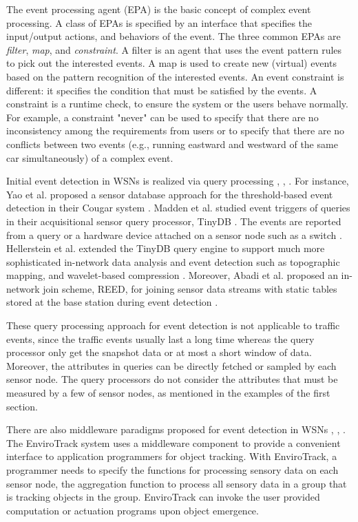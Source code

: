 \documentclass[12pt,journal,draftcls,letterpaper,onecolumn]{elsarticle}
\begin{document}
The event processing agent (EPA) is the basic concept of complex
event processing. A class of EPAs is specified by an interface that
specifies the input/output actions, and behaviors of the event. The
three common EPAs are \emph{filter}, \emph{map}, and
\emph{constraint}. A filter is an agent that uses the event pattern
rules to pick out the interested events. A map is used to create new
(virtual) events based on the pattern recognition of the interested
events. An event constraint is different: it specifies the condition
that must be satisfied by the events. A constraint is a runtime
check, to ensure the system or the users behave normally. For
example, a constraint "never" can be used to specify that there are
no inconsistency among the requirements from users or to specify
that there are no conflicts between two events (e.g., running
eastward and westward of the same car simultaneously) of a complex
event.

Initial event detection in WSNs is realized via query processing
\cite{345920}, \cite{cougar}, \cite{tinydb}. For instance, Yao et
al. proposed a sensor database approach for the threshold-based
event detection in their Cougar system \cite{cougar}. Madden et al.
studied event triggers of queries in their acquisitional sensor
query processor, TinyDB \cite{tinydb}. The events are reported from
a query or a hardware device attached on a sensor node such as a
switch \cite{tinydb}. Hellerstein et al. extended the TinyDB query
engine to support much more sophisticated in-network data analysis
and event detection such as topographic mapping, and wavelet-based
compression \cite{Hellerstein03beyondaverage}. Moreover, Abadi et
al. proposed an in-network join scheme, REED, for joining sensor
data streams with static tables stored at the base station during
event detection \cite{DBLP:conf/vldb/AbadiML05}.

These query processing approach for event detection is not
applicable to traffic events, since the traffic events usually last
a long time whereas the query processor only get the snapshot data
or at most a short window of data.  Moreover, the attributes in
queries can be directly fetched or sampled by each sensor node. The
query processors do not consider the attributes that must be
measured by a few of sensor nodes, as mentioned in the examples of
the first section.

There are also middleware paradigms proposed for event detection in
WSNs \cite{1281625}, \cite{Li03eventdetection}, \cite{1101491}. The
EnviroTrack system \cite{1281625} uses a middleware component to
provide a convenient interface to application programmers for object
tracking. With EnviroTrack, a programmer
 needs to specify the functions for processing sensory data on
each sensor node, the aggregation function to process all sensory
data in a group that is tracking objects in the group. EnviroTrack
can invoke the user provided computation or actuation programs upon
object emergence.
\end{document}
